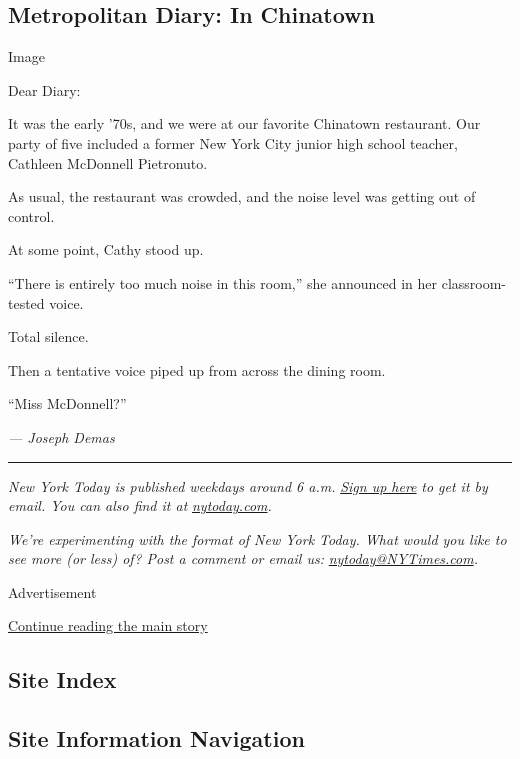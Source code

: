 \hypertarget{metropolitan-diary-in-chinatown}{%
\subsection{Metropolitan Diary: In
Chinatown}\label{metropolitan-diary-in-chinatown}}

Image

Dear Diary:

It was the early '70s, and we were at our favorite Chinatown restaurant.
Our party of five included a former New York City junior high school
teacher, Cathleen McDonnell Pietronuto.

As usual, the restaurant was crowded, and the noise level was getting
out of control.

At some point, Cathy stood up.

``There is entirely too much noise in this room,'' she announced in her
classroom-tested voice.

Total silence.

Then a tentative voice piped up from across the dining room.

``Miss McDonnell?''

\emph{--- Joseph Demas}

\begin{center}\rule{0.5\linewidth}{\linethickness}\end{center}

\emph{New York Today is published weekdays around 6 a.m.}
\href{https://www.nytimes3xbfgragh.onion/newsletters/newyorktoday?module=inline}{\emph{Sign
up here}} \emph{to get it by email. You can also find it at}
\href{http://www.nytoday.com/}{\emph{nytoday.com}}\emph{.}

\emph{We're experimenting with the format of New York Today. What would
you like to see more (or less) of? Post a comment or email us:}
\href{mailto:nytoday@NYTimes.com}{\emph{nytoday@NYTimes.com}}\emph{.}

Advertisement

\protect\hyperlink{after-bottom}{Continue reading the main story}

\hypertarget{site-index}{%
\subsection{Site Index}\label{site-index}}

\hypertarget{site-information-navigation}{%
\subsection{Site Information
Navigation}\label{site-information-navigation}}

